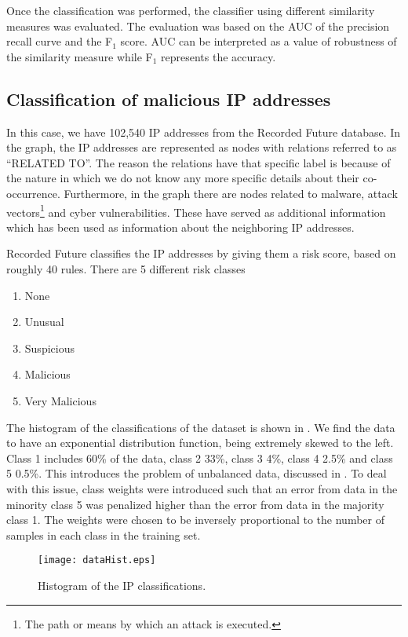 Once the classification was performed, the classifier using different similarity measures was evaluated. The evaluation was based on the AUC of the precision recall curve and the F$_1$ score. AUC can be interpreted as a value of robustness of the similarity measure while F$_1$ represents the accuracy.

\subsection{Classification of malicious IP addresses \label{methodSVM}}
In this case, we have 102,540 IP addresses from the Recorded Future database. In the graph, the IP addresses are represented as nodes with relations referred to as ``RELATED TO''. The reason the relations have that specific label is because of the nature in which we do not know any more specific details about their co-occurrence. Furthermore, in the graph there are nodes related to malware, attack vectors\footnote{The path or means by which an attack is executed.} and cyber vulnerabilities. These have served as additional information which has been used as information about the neighboring IP addresses.

Recorded Future classifies the IP addresses by giving them a risk score, based on roughly 40 rules. There are 5 different risk classes
\begin{enumerate}
    \item None
    \item Unusual
    \item Suspicious
    \item Malicious
    \item Very Malicious
\end{enumerate}

The histogram of the classifications of the dataset is shown in . We find the data to have an exponential distribution function, being extremely skewed to the left. Class 1 includes 60\% of the data, class 2 33\%, class 3 4\%, class 4 2.5\% and class 5 0.5\%. This introduces the problem of unbalanced data, discussed in . To deal with this issue, class weights were introduced such that an error from data in the minority class 5 was penalized higher than the error from data in the majority class 1. The weights were chosen to be inversely proportional to the number of samples in each class in the training set.

\begin{figure}[h!]
    \centering
    \texttt{[image: dataHist.eps]}
    \caption{Histogram of the IP classifications.}
    \label{hist}
\end{figure}

